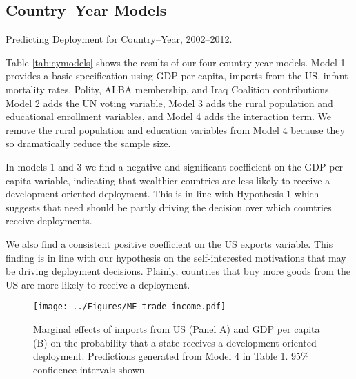 \documentclass[12pt]{article}
\begin{document}
\begin{doublespace}
\subsection{Country--Year Models}



\begin{table}[t]
     \caption{Predicting Deployment for Country--Year, 2002--2012.}
     \label{tab:cymodels}
     \centering\scalebox{.75}{}
\end{table}

Table \ref{tab:cymodels} shows the results of our four country-year models. Model 1 provides a basic specification using GDP per capita, imports from the US, infant mortality rates, Polity, ALBA membership, and Iraq Coalition contributions. Model 2 adds the UN voting variable, Model 3 adds the rural population and educational enrollment variables, and Model 4 adds the interaction term. We remove the rural population and education variables from Model 4 because they so dramatically reduce the sample size.

In models 1 and 3 we find a negative and significant coefficient on the GDP per capita variable, indicating that wealthier countries are less likely to receive a development-oriented deployment. This is in line with Hypothesis 1 which suggests that need should be partly driving the decision over which countries receive deployments. 

We also find a consistent positive coefficient on the US exports variable. This finding is in line with our hypothesis on the self-interested motivations that may be driving deployment decisions. Plainly, countries that buy more goods from the US are more likely to receive a deployment.

\begin{figure}[t]
\begin{center}
\texttt{[image: ../Figures/ME\_trade\_income.pdf]}
\caption{Marginal effects of imports from US (Panel A) and GDP per capita (B) on the probability that a state receives a development-oriented deployment. Predictions generated from Model 4 in Table 1. 95\% confidence intervals shown.}
\label{fig:meCY}
\end{center}
\end{figure}


\end{doublespace}
\end{document}
